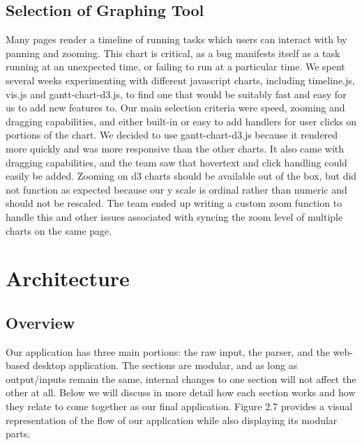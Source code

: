 \documentclass{hmcclinic}
\begin{document}
\subsection{Selection of Graphing Tool} %
  Many pages render a timeline of running tasks which users can interact
  with by panning and zooming. This chart is critical, as a bug manifests
  itself as a task running at an unexpected time, or failing to run at a
  particular time. We spent several weeks experimenting with different
  javascript charts, including timeline.js, vis.js and gantt-chart-d3.js,
  to find one that would be suitably fast and easy for us to add new
  features to. Our main selection criteria were speed, zooming and dragging
  capabilities, and either built-in or easy to add handlers for user clicks
  on portions of the chart. We decided to use gantt-chart-d3.js because it
  rendered more quickly and was more responsive than the other charts. It
  also came with dragging capabilities, and the team saw that hovertext and
  click handling could easily be added. Zooming on d3 charts should be
  available out of the box, but did not function as expected because our y scale
  is ordinal rather than numeric and should not be rescaled. The team
  ended up writing a custom zoom function to handle this and other issues
  associated with syncing the zoom level of  multiple charts on the same page.


\section{Architecture} %

  \subsection{Overview}

  Our application has three main portions: the raw input, the parser,
  and the web-based desktop application. The sections are modular, and
  as long as output/inputs remain the same, internal changes to one section will
  not affect the other at all. Below we will discuss in more detail how each
  section works and how they relate to come together as our final application.
  Figure 2.7 provides a visual representation of the flow of our application
  while also displaying its modular parts.
  
\end{document}
